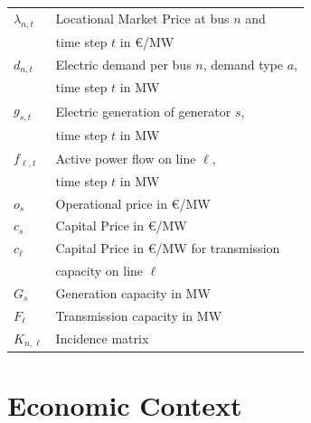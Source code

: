\documentclass[11pt,twocolumn]{article}
\newcommand{\vpad}{\vspace{1mm}}
\newcommand{\generation}{g_{s,t}}
\newcommand{\capacityGeneration}{G_{s}}
\newcommand{\capacityFlow}{F_{\ell}}
\newcommand{\capexGeneration}{c_{s}}
\newcommand{\capexFlow}{c_{\ell}}
\newcommand{\opexGeneration}{o_{s}}
\newcommand{\demand}[1][n]{d_{#1,t}}
\newcommand{\incidence}[1][n]{K_{#1,\ell}}
\newcommand{\lmp}[1][n]{\lambda_{#1,t}}
\newcommand{\flow}{f_{\ell,t}}
\begin{document}
\begin{table}[h]
    \centering
    \begin{tabular}{ll}
        $\lmp$ & Locational Market Price at bus $n$ and  \\ & time step $t$ in \euro/MW \vpad \\
        $\demand$ & Electric demand per bus $n$, demand type $a$, \\ & time step $t$ in MW  \vpad \\
        $\generation$ & Electric generation of generator $s$, \\ & time step $t$  in MW \vpad \\
        $\flow$ & Active power flow on line $\ell$, \\ & time step $t$ in MW   \vpad \\
        $\opexGeneration$ & Operational price in \euro/MW \vpad \\
        $\capexGeneration$ & Capital Price in \euro/MW \vpad \\
        $\capexFlow$  & Capital Price in \euro/MW for transmission \\ & capacity on line $\ell$  \vpad \\
        $\capacityGeneration$ & Generation capacity in MW \vpad \\
        $\capacityFlow$ & Transmission capacity in MW \vpad \\
        $\incidence$ & Incidence matrix \vpad 
    \end{tabular}
\end{table}

\section{Economic Context}
\end{document}
